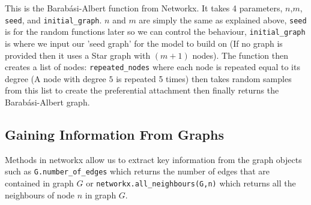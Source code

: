 \documentclass{article}
\begin{document}
        This is the Barabási-Albert function from Networkx. It takes 4 parameters, $n$,$m$, \verb|seed|, and \verb|initial_graph|. $n$ and $m$ are simply the same as explained above, \verb|seed| is for the random functions later so we can control the behaviour,  \verb|initial_graph| is where we input our 'seed graph' for the model to build on (If no graph is provided then it uses a Star graph with $(m+1)$ nodes). The function then creates a list of nodes: \verb|repeated_nodes| where each node is repeated equal to its degree (A node with degree $5$ is repeated 5 times) then takes random samples from this list to create the preferential attachment then finally returns the Barabási-Albert graph. 
        
        \subsection{Gaining Information From Graphs}
        Methods in networkx allow us to extract key information from the graph objects such as \verb|G.number_of_edges| which returns the number of edges that are contained in graph $G$ or \verb|networkx.all_neighbours(G,n)| which returns all the neighbours of node $n$ in graph $G$.
\printbibliography
\end{document}
